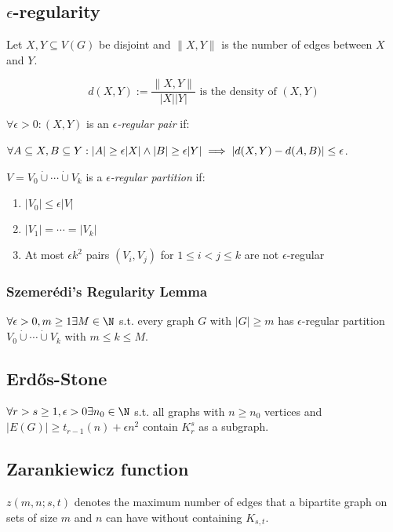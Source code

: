 \subsection*{$\epsilon$-regularity}

Let $X, Y \subseteq V(G)$ be disjoint and $\|X,Y\|$ is the number of edges between $X$ and $Y$.

$$d(X,Y) := \frac{\|X,Y\|}{|X||Y|} \text{ is the density of $(X, Y)$}$$

$\forall \epsilon > 0 : (X,Y)$ is an \emph{$\epsilon$-regular pair} if:

$\forall A \subseteq X, B \subseteq Y : \\ |A| \geq \epsilon|X| \land |B| \geq \epsilon|Y| \implies |d(X,Y) - d(A,B)| \leq \epsilon$.

\spacing

$V=V_0 \dot\cup\cdots\dot\cup V_k$ is a \emph{$\epsilon$-regular partition} if:

\begin{enumerate}
	\item $|V_0| \leq \epsilon|V|$
	\item $|V_1| = \cdots = |V_k|$
	\item At most $\epsilon k^2$ pairs $(V_i,V_j)$ for $1 \leq i < j \leq k$ are not $\epsilon$-regular
\end{enumerate}

\subsubsection*{Szemer\'{e}di's Regularity Lemma}

$\forall \epsilon > 0, m \geq 1 \exists M \in \N$ s.t. every graph $G$ with $|G| \geq m$ has $\epsilon$-regular partition $V_0 \dot\cup\cdots\dot\cup V_k$ with $m \leq k \leq M$.

\subsection*{Erd\H{o}s-Stone}

$\forall r > s \geq 1, \epsilon > 0 \exists n_0 \in \N$ s.t. all graphs with $n \geq n_0$ vertices and $|E(G)| \geq t_{r-1}(n)+\epsilon n^2$ contain $K_r^s$ as a subgraph.

\subsection*{Zarankiewicz function}

$z(m,n;s,t)$ denotes the maximum number of edges that a bipartite graph on sets of size $m$ and $n$ can have without containing $K_{s,t}$.

